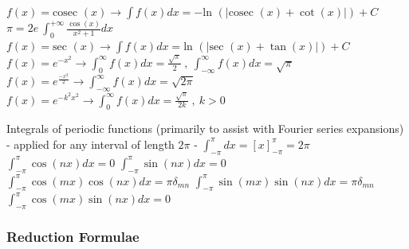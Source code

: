 \documentclass[12pt]{article}
\def\cosec{\text{cosec\ }} %
\def\sec{\text{sec\ }} %
\def\ln{\text{ln\ }} %
\begin{document}
\begin{flushleft}
	\textbullet \quad $\displaystyle f(x) = \cosec (x) \rightarrow \int f(x) dx = - \ln (|\cosec (x) + \cot (x) | ) + C$ \linebreak 
	\textbullet \quad $\displaystyle \pi = 2 e \ \int_0^{+\infty} \frac{\cos (x)}{x^2 + 1} dx $ \linebreak 
	\textbullet \quad $\displaystyle f(x) = \sec (x) \rightarrow \int f(x) dx = \ln (|\sec (x) + \tan (x) | ) + C$ \linebreak 
	\textbullet \quad $\displaystyle f(x) = e^{-x^2} \rightarrow \int_{0}^{\infty} f(x) dx = \frac{\sqrt{\pi}}{2}\ , \ \int_{-\infty}^{\infty} f(x) dx = \sqrt{\pi} $ \linebreak 
	\textbullet \quad $\displaystyle f(x) = e^{\frac{-x^2}{2}} \rightarrow \int_{-\infty}^{\infty} f(x) dx = \sqrt{2\pi} $ \linebreak 
	\textbullet \quad $\displaystyle f(x) = e^{-k^2x^2} \rightarrow \int_{0}^{\infty} f(x) dx = \frac{\sqrt{\pi}}{2k} \ , \ k>0$ \linebreak 
	
	Integrals of periodic functions (primarily to assist with Fourier series expansions) - applied for any interval of length $2\pi$ - \linebreak 
	\textbullet \quad $\displaystyle \int_{-\pi}^{\pi} dx = \left[ x \right]_{-\pi}^{\pi} = 2\pi $ \linebreak 
	\textbullet \quad $\displaystyle \int_{-\pi}^{\pi} \cos (nx) dx = 0 $ \linebreak 
	\textbullet \quad $\displaystyle \int_{-\pi}^{\pi} \sin (nx) dx = 0 $ \linebreak 
	\textbullet \quad $\displaystyle \int_{-\pi}^{\pi} \cos (mx) \cos (nx) dx = \pi \delta_{mn} $ \linebreak 
	\textbullet \quad $\displaystyle \int_{-\pi}^{\pi} \sin (mx) \sin (nx) dx = \pi \delta_{mn} $ \linebreak 
	\textbullet \quad $\displaystyle \int_{-\pi}^{\pi} \cos (mx) \sin (nx) dx = 0 $ \linebreak 
	
	\subsubsection{Reduction Formulae}


\end{flushleft}
\end{document}
